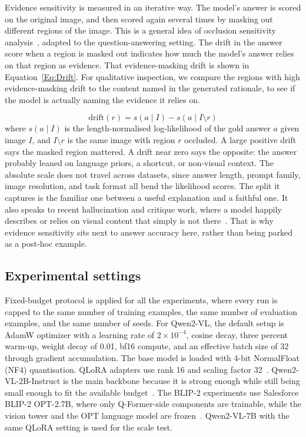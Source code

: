 \documentclass[preprint,12pt]{elsarticle}
\begin{document}
Evidence sensitivity is measured in an iterative way.
The model's answer is scored on the original image, and then scored again several times by masking out different regions of the image.
This is a general idea of occlusion sensitivity analysis~\cite{zeiler2014visualizing}, adapted to the question-answering setting.
The drift in the answer score when a region is masked out indicates how much the model's answer relies on that region as evidence.
That evidence-masking drift is shown in Equation~\ref{Eq:Drift}.
For qualitative inspection, we compare the regions with high evidence-masking drift to the content named in the generated rationale,
to see if the model is actually naming the evidence it relies on.

\begin{equation}
    \mathrm{drift}(r) = s\!\left(a \mid I\right) - s\!\left(a \mid I \setminus r\right)
    \label{Eq:Drift}
\end{equation}
where $s(a \mid I)$ is the length-normalised log-likelihood of the gold answer $a$ given image $I$, and $I \setminus r$ is the same image with region $r$ occluded.
A large positive drift says the masked region mattered.
A drift near zero says the opposite: the answer probably leaned on language priors, a shortcut, or non-visual context.
The absolute scale does not travel across datasets, since answer length, prompt family, image resolution, and task format all bend the likelihood scores.
The split it captures is the familiar one between a useful explanation and a faithful one.
It also speaks to recent hallucination and critique work, where a model happily describes or relies on visual content that simply is not there~\cite{guan2024hallusionbench,jiang2024hacl,wu2025visco,zhang2025criticv}.
That is why evidence sensitivity sits next to answer accuracy here, rather than being parked as a post-hoc example.

\subsection{Experimental settings}

Fixed-budget protocol is applied for all the experiments, 
where every run is capped to the same number of training examples,
the same number of evaluation examples, and the same number of seeds.
For Qwen2-VL, the default setup is AdamW optimizer with a learning rate of $2 \times 10^{-4}$,
cosine decay, three percent warm-up, weight decay of 0.01, bf16 compute, and an effective batch size of 32 through gradient accumulation.
The base model is loaded with 4-bit NormalFloat (NF4) quantisation.
QLoRA adapters use rank 16 and scaling factor 32~\cite{hu2022lora,dettmers2023qlora}.
Qwen2-VL-2B-Instruct is the main backbone because it is strong enough while still being small enough to fit the available budget~\cite{wang2024qwen2vl}.
The BLIP-2 experiments use Salesforce BLIP-2 OPT-2.7B, where only Q-Former-side components are trainable, while the vision tower and the OPT language model are frozen~\cite{li2023blip2}.
Qwen2-VL-7B with the same QLoRA setting is used for the scale test.
\end{document}
